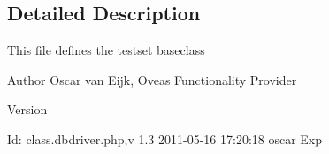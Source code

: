 \subsection{Detailed Description}
This file defines the testset baseclass \begin{DoxyAuthor}{Author}
Oscar van Eijk, Oveas Functionality Provider 
\end{DoxyAuthor}
\begin{DoxyVersion}{Version}

\end{DoxyVersion}
\begin{DoxyParagraph}{Id:}
class.dbdriver.php,v 1.3 2011-\/05-\/16 17:20:18 oscar Exp 
\end{DoxyParagraph}
